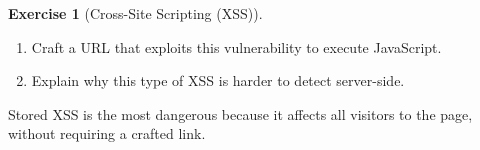 \documentclass[a4paper,11pt]{article}
\theoremstyle{plain}
\theoremstyle{definition}
\newtheorem{exercice}{Exercise}
\begin{document}
\begin{exercice}[Cross-Site Scripting (XSS)]
\begin{enumerate}
    \item Craft a URL that exploits this vulnerability to execute JavaScript.
    \item Explain why this type of XSS is harder to detect server-side.
\end{enumerate}

\begin{attention}
Stored XSS is the most dangerous because it affects all visitors to the page, without requiring a crafted link.
\end{attention}

\end{exercice}


\end{document}
